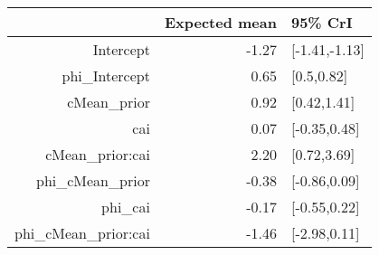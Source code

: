 \begin{tabular}{rrl}
  \hline
 & Expected mean & 95\% CrI \\ 
  \hline
Intercept & -1.27 & [-1.41,-1.13] \\ 
  phi\_Intercept & 0.65 & [0.5,0.82] \\ 
  cMean\_prior & 0.92 & [0.42,1.41] \\ 
  cai & 0.07 & [-0.35,0.48] \\ 
  cMean\_prior:cai & 2.20 & [0.72,3.69] \\ 
  phi\_cMean\_prior & -0.38 & [-0.86,0.09] \\ 
  phi\_cai & -0.17 & [-0.55,0.22] \\ 
  phi\_cMean\_prior:cai & -1.46 & [-2.98,0.11] \\ 
   \hline
\end{tabular}

